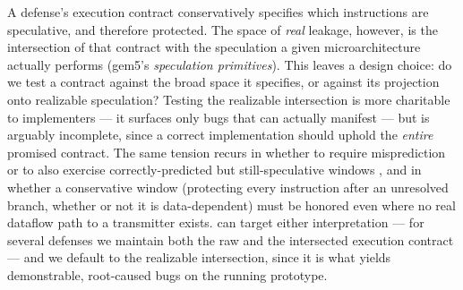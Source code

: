 A defense's execution contract conservatively specifies which instructions are speculative, and therefore protected. The space of \emph{real} leakage, however, is the intersection of that contract with the speculation a given microarchitecture actually performs (gem5's \emph{speculation primitives}). This leaves a design choice: do we test a contract against the broad space it specifies, or against its projection onto realizable speculation? Testing the realizable intersection is more charitable to implementers --- it surfaces only bugs that can actually manifest --- but is arguably incomplete, since a correct implementation should uphold the \emph{entire} promised contract. The same tension recurs in whether to require misprediction or to also exercise correctly-predicted but still-speculative windows
\urgentbr
{}%
\notebr
, and in whether a conservative window (protecting every instruction after an unresolved branch, whether or not it is data-dependent) must be honored even where no real dataflow path to a transmitter exists. \toolname{} can target either interpretation --- for several defenses we maintain both the raw and the intersected execution contract
\notebr
{}
\notebr
--- and we default to the realizable intersection, since it is what yields demonstrable, root-caused bugs on the running prototype.


